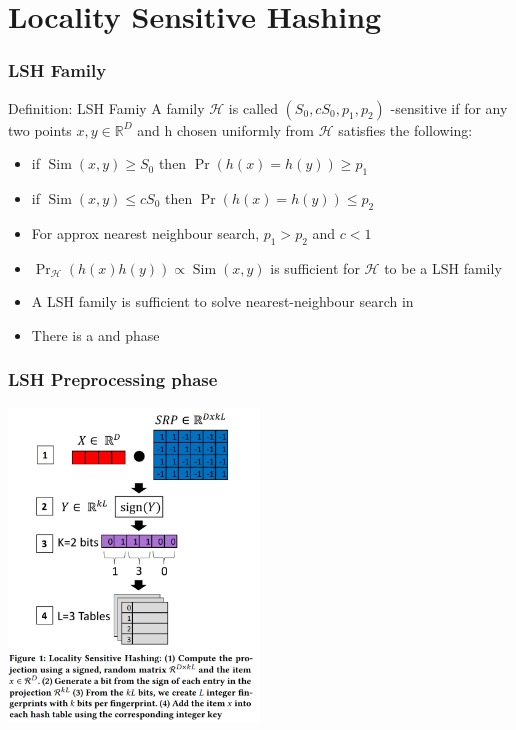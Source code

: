 \documentclass{beamer}
\begin{document}
\section{Locality Sensitive Hashing}
\begin{frame}
    \frametitle{LSH Family}
    \begin{block}{Definition: LSH Famiy}
        A family $\mathcal{H}$ is called $\left(S_{0}, c S_{0}, p_{1}, p_{2}\right)$ -sensitive if for any two points $x, y \in \mathbb{R}^{D}$ and h chosen uniformly from $\mathcal{H}$ satisfies the following:
        \begin{itemize}
            \item if $\operatorname{Sim}(x, y) \geq S_{0}$ then $\operatorname{Pr}(h(x)=h(y)) \geq p_{1}$
            \item  if $\operatorname{Sim}(x, y) \leq c S_{0}$ then $\operatorname{Pr}(h(x)=h(y)) \leq p_{2}$
        \end{itemize}
    \end{block}
    \begin{itemize}
        \item For approx nearest neighbour search, $p_1>p_2$ and $c<1$
        \item $\operatorname{Pr}_{\mathcal{H}}(h(x)h(y)) \propto \operatorname{Sim}(x,y)$ is sufficient for $\mathcal{H}$ to be a LSH family
        \item A LSH family is sufficient to solve nearest-neighbour search in 
        \item There is a  and  phase
    \end{itemize}
\end{frame}

\begin{frame}
    \frametitle{LSH Preprocessing phase}
    \centering
    \includegraphics[width=0.5\textwidth]{images/lsh.png}
\end{frame}
\end{document}
